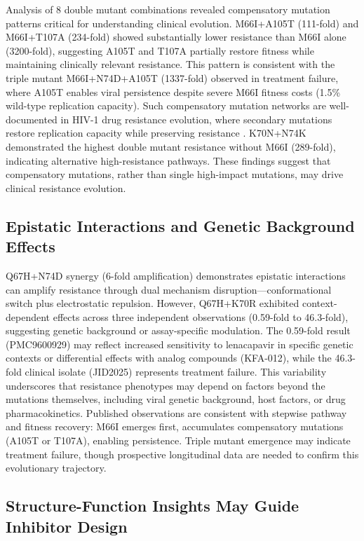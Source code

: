 \documentclass[preprint]{elsarticle}
\begin{document}
Analysis of 8 double mutant combinations revealed compensatory mutation patterns critical for understanding clinical evolution. M66I+A105T (111-fold) and M66I+T107A (234-fold) showed substantially lower resistance than M66I alone (3200-fold), suggesting A105T and T107A partially restore fitness while maintaining clinically relevant resistance. This pattern is consistent with the triple mutant M66I+N74D+A105T (1337-fold) observed in treatment failure, where A105T enables viral persistence despite severe M66I fitness costs (1.5\% wild-type replication capacity). Such compensatory mutation networks are well-documented in HIV-1 drug resistance evolution, where secondary mutations restore replication capacity while preserving resistance \cite{Martinez2008,Hinkley2011}. K70N+N74K demonstrated the highest double mutant resistance without M66I (289-fold), indicating alternative high-resistance pathways. These findings suggest that compensatory mutations, rather than single high-impact mutations, may drive clinical resistance evolution.

\subsection{Epistatic Interactions and Genetic Background Effects}

Q67H+N74D synergy (6-fold amplification) demonstrates epistatic interactions can amplify resistance through dual mechanism disruption—conformational switch plus electrostatic repulsion. However, Q67H+K70R exhibited context-dependent effects across three independent observations (0.59-fold to 46.3-fold), suggesting genetic background or assay-specific modulation. The 0.59-fold result (PMC9600929) may reflect increased sensitivity to lenacapavir in specific genetic contexts or differential effects with analog compounds (KFA-012), while the 46.3-fold clinical isolate (JID2025) represents treatment failure. This variability underscores that resistance phenotypes may depend on factors beyond the mutations themselves, including viral genetic background, host factors, or drug pharmacokinetics. Published observations are consistent with stepwise pathway and fitness recovery: M66I emerges first, accumulates compensatory mutations (A105T or T107A), enabling persistence. Triple mutant emergence may indicate treatment failure, though prospective longitudinal data are needed to confirm this evolutionary trajectory.

\subsection{Structure-Function Insights May Guide Inhibitor Design}
\end{document}
